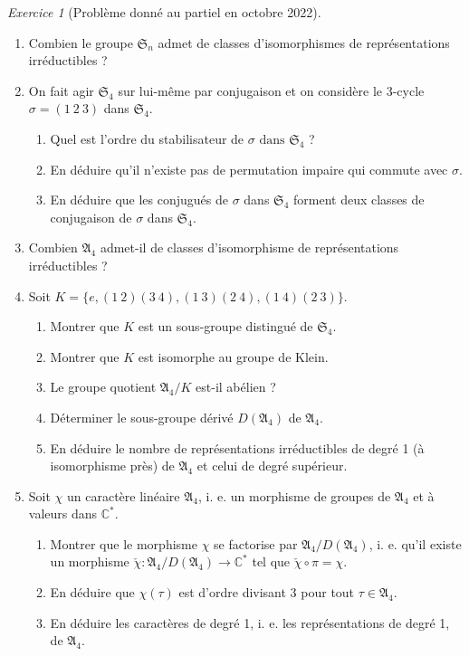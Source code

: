 \documentclass[french]{book}
\theoremstyle{definition}
\theoremstyle{remark}
\newtheorem{exo}{Exercice}
\begin{document}
\begin{exo}[Problème donné au partiel en octobre 2022]

  \

  \begin{enumerate}
    \item Combien le groupe \(\mathfrak{S}_n\) admet de classes d'isomorphismes de représentations irréductibles ?
    \item On fait agir \(\mathfrak{S}_{4}\) sur lui-même par conjugaison et on considère le 3-cycle \(\sigma = (1 \ 2 \ 3)\) dans \(\mathfrak{S}_{4}\).
    \begin{enumerate}
      \item Quel est l'ordre du stabilisateur de \(\sigma \text{ dans } \mathfrak{S}_{4}\) ?
      \item En déduire qu'il n'existe pas de permutation impaire qui commute avec \(\sigma\).
      \item En déduire que les conjugués de \(\sigma\) dans \(\mathfrak{S}_{4}\) forment deux classes de conjugaison de \(\sigma\) dans \(\mathfrak{S}_{4}\).
    \end{enumerate}
    \item Combien \(\mathfrak{A}_4\) admet-il de classes d'isomorphisme de représentations irréductibles ?
    \item Soit \(K = \{ e, (1 \ 2)(3 \ 4), (1 \ 3)(2 \ 4), (1 \ 4)(2 \ 3)\}\).
    \begin{enumerate}
      \item Montrer que \(K\) est un sous-groupe distingué de \(\mathfrak{S}_{4}\).
      \item Montrer que \(K\) est isomorphe au groupe de Klein.
      \item Le groupe quotient \(\mathfrak{A}_4/ K\) est-il abélien ?
      \item Déterminer le sous-groupe dérivé \(D(\mathfrak{A}_{4})\) de \(\mathfrak{A}_4\).
      \item En déduire le nombre de représentations irréductibles de degré 1 (à isomorphisme près) de \(\mathfrak{A}_4\) et celui de degré supérieur.
    \end{enumerate}

    \item {} Soit \(\chi\) un caractère linéaire \(\mathfrak{A}_4\), i. e. un morphisme de groupes de \(\mathfrak{A}_4\) et à valeurs dans \(\mathbb{C}^*\).

    \begin{enumerate}
      \item Montrer que le morphisme \(\chi\) se factorise par \(\mathfrak{A}_4 / D(\mathfrak{A}_4)\), i. e. qu'il existe un morphisme \(\check{\chi} : \mathfrak{A}_4 / D(\mathfrak{A}_4) \longrightarrow \mathbb{C}^{*}\) tel que \(\check{\chi} \circ \pi = \chi\).
      \item En déduire que \(\chi(\tau)\) est d'ordre divisant 3 pour tout \(\tau \in \mathfrak{A}_{4}\).
      \item En déduire les caractères de degré 1, i. e. les représentations de degré 1, de \(\mathfrak{A}_{4}\).
    \end{enumerate}


\end{enumerate}
\end{exo}
\end{document}
